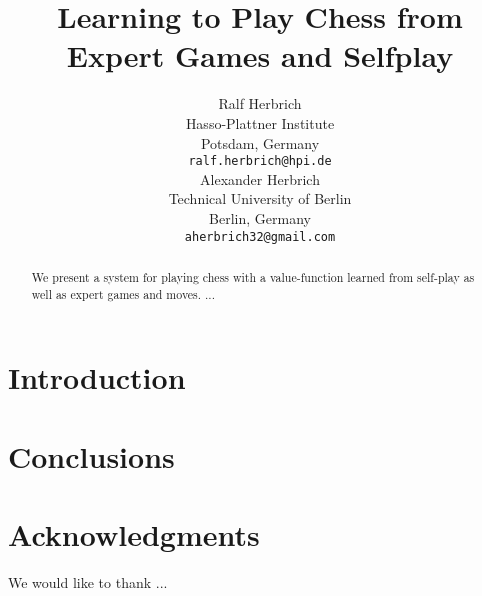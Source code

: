 \documentclass{article}
\newcommand{\eat}[1]{#1}
\begin{document}
\title{Learning to Play Chess from Expert Games and Selfplay}

\eat{
\author{Ralf Herbrich \\
Hasso-Plattner Institute \\
Potsdam, Germany \\
\texttt{ralf.herbrich@hpi.de} \\ 
\And
Alexander Herbrich \\
Technical University of Berlin \\
Berlin, Germany \\
\texttt{aherbrich32@gmail.com}
}
}

\maketitle

\begin{abstract}
We present a system for playing chess with a value-function learned from self-play as well as expert games and moves. ... 
\end{abstract}

\section{Introduction}


\section{Conclusions}

\section*{Acknowledgments}
We would like to thank ...

\appendix



\end{document}
